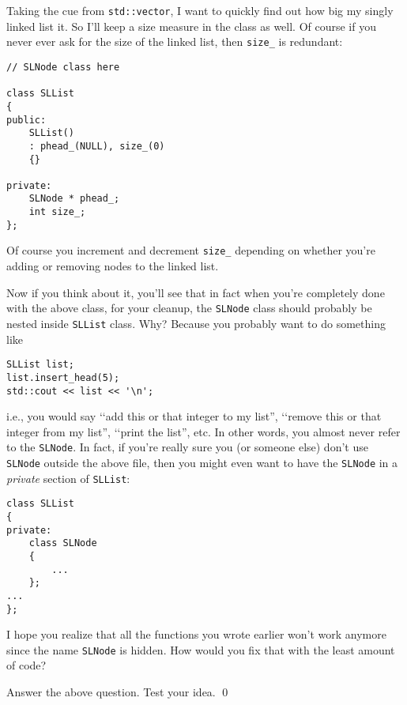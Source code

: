 Taking the cue from \texttt{std::vector},
I want to quickly find out how big
my singly linked list it.
So I'll keep a size measure in the class as well.
Of course if you never ever ask for the size
of the linked list, then \texttt{size\_} is
redundant:
{\small
\begin{Verbatim}[frame=single]
// SLNode class here

class SLList
{
public:
    SLList()
    : phead_(NULL), size_(0)
    {}
    
private:
    SLNode * phead_;
    int size_;
};
\end{Verbatim}
}
Of course you increment and decrement \verb!size_!
depending on whether you're adding or removing
nodes to the linked list.


Now if you think about it, you'll see that in fact when you're
completely done with the above class, for your cleanup,
the
\texttt{SLNode} class should probably be nested inside
\texttt{SLList} class.
Why?
Because you probably want to do something like
\begin{Verbatim}[frame=single]
SLList list;
list.insert_head(5);
std::cout << list << '\n';
\end{Verbatim}
i.e., you would say \lq\lq add this or that integer to my list'',
\lq\lq remove this or that integer from my list'',
\lq\lq print the list'', etc.
In other words, you almost never refer to the \texttt{SLNode}.
In fact, if you're really sure you (or someone else)
don't use \texttt{SLNode}
outside the above file, then you might even want to have
the \texttt{SLNode} in a \textit{private} section of \texttt{SLList}:
{\small
\begin{Verbatim}[frame=single]
class SLList
{
private:
    class SLNode
    {
        ...
    };
...    
};
\end{Verbatim}
}
I hope you realize that all the functions you wrote earlier won't work
anymore since the name \texttt{SLNode} is hidden.
How would you fix that with the least amount of code?

\begin{ex}
Answer the above question. Test your idea.
\qed
\end{ex}



